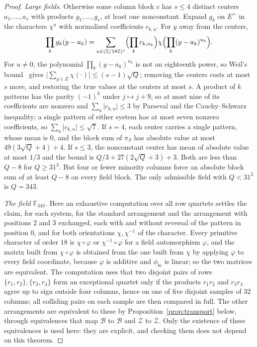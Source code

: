 \documentclass[11pt]{article}
\theoremstyle{plain}
\theoremstyle{definition}
\theoremstyle{remark}
\newcommand{\F}{\mathbb F}
\newcommand{\Z}{\mathbb Z}
\newcommand{\abs}[1]{\lvert#1\rvert}
\begin{document}
\begin{proof}
\emph{Large fields.} Otherwise some column block $c$ has $s\le4$ distinct
centers $a_1,\dots,a_s$ with products $g_1,\dots,g_s$, at least one
nonconstant. Expand $g_k$ on $E^\times$ in the characters $\chi^u$ with
normalized coefficients $c_{k,u}$. For $y$ away from the centers,
\[
 \prod_k g_k(y-a_k)=\sum_{u\in(\Z/18\Z)^s}\Bigl(\prod_k c_{k,u_k}\Bigr)
 \chi\Bigl(\prod_k(y-a_k)^{u_k}\Bigr).
\]
For $u\ne0$, the polynomial $\prod_k(y-a_k)^{u_k}$ is not an eighteenth power,
so Weil's bound~\cite[Theorem 5.41]{LidlNiederreiter} gives
$\abs{\sum_{y\in E}\chi(\cdot)}\le(s-1)\sqrt Q$; removing the centers costs
at most $s$ more, and restoring the true values at the centers at most $s$.
A product of $k$ patterns has the parity $(-1)^k$ under $j\mapsto j+9$, so at
most nine of its coefficients are nonzero and $\sum_u\abs{c_{k,u}}\le3$ by
Parseval and the Cauchy--Schwarz inequality; a single pattern of either system has at most seven nonzero
coefficients, so $\sum_u\abs{c_{k,u}}\le\sqrt7$. If $s=4$, each center carries
a single pattern, whose mean is $0$, and the block sum of $\pi_S$ has absolute
value at most $49(3\sqrt Q+4)+4$. If $s\le3$, the nonconstant center has mean
of absolute value at most $1/3$ and the bound is $Q/3+27(2\sqrt Q+3)+3$. Both
are less than $Q-8$ for $Q\ge31^3$. But four or fewer minority columns force
an absolute block sum of at least $Q-8$ on every field block. The only
admissible field with $Q<31^3$ is $Q=343$.

\emph{The field $\F_{343}$.} Here an exhaustive computation over all row
quartets settles the claim, for each system, for the standard arrangement and
the arrangement with positions $2$ and $3$ exchanged, each with and without
reversal of the pattern in position $0$, and for both orientations
$\chi,\chi^{-1}$ of the character. Every primitive character of order $18$ is
$\chi\circ\varphi$ or $\chi^{-1}\circ\varphi$ for a field automorphism
$\varphi$, and the matrix built from $\chi\circ\varphi$ is obtained from the
one built from $\chi$ by applying $\varphi$ to every field coordinate,
because $\varphi$ is additive and $\phi_{bc}$ is linear; so the two matrices
are equivalent. The computation
uses that two disjoint pairs of rows $\{r_1,r_2\},\{r_3,r_4\}$ form an
exceptional quartet only if the products $r_1r_2$ and $r_3r_4$ agree up to
sign outside four columns, hence on one of five disjoint samples of $32$
columns; all colliding pairs on each sample are then compared in full. The
other arrangements are equivalent to these by Proposition~\ref{prop:transport}
below, through equivalences that map $\mathcal B$ to $\mathcal B$ and
$\mathcal Z$ to $\mathcal Z$. Only the existence of these equivalences is used
here: they are explicit, and checking them does not depend on this
theorem.
\end{proof}
\end{document}
